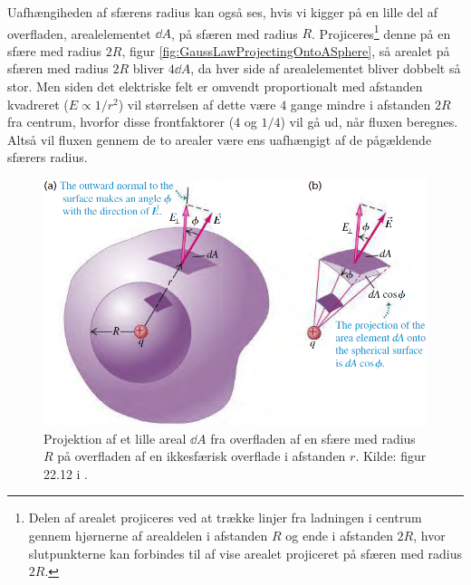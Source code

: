 Uafhængiheden af sfærens radius kan også ses, hvis vi kigger på en lille del af overfladen, arealelementet $\dd{A}$, på sfæren med radius $R$. Projiceres\footnote{Delen af arealet projiceres ved at trække linjer fra ladningen i centrum gennem hjørnerne af arealdelen i afstanden $R$ og ende i afstanden $2R$, hvor slutpunkterne kan forbindes til af vise arealet projiceret på sfæren med radius $2R$.} denne på en sfære med radius $2R$, figur \ref{fig:GaussLawProjectingOntoASphere}, så arealet på sfæren med radius $2R$ bliver $4\dd{A}$, da hver side af arealelementet bliver dobbelt så stor. Men siden det elektriske felt er omvendt proportionalt med afstanden kvadreret ($E \propto 1/r^2$) vil størrelsen af dette være $4$ gange mindre i afstanden $2R$ fra centrum, hvorfor disse frontfaktorer ($4$ og $1/4$) vil gå ud, når fluxen beregnes. Altså vil fluxen gennem de to arealer være ens uafhængigt af de pågældende sfærers radius.

\begin{figure}[h!]
    \centering
    \includegraphics[width=.75\textwidth]{Elektro/Figurer/GaussLawProjectingOntoAnArbitraryShape.PNG}
    \caption{Projektion af et lille areal $\dd{A}$ fra overfladen af en sfære med radius $R$ på overfladen af en ikkesfærisk overflade i afstanden $r$. Kilde: figur 22.12 i \cite{youngSearsZemanskyUniversity2016}.}
    \label{fig:GaussLawProjectingOntoanArbitraryShape}
\end{figure}

